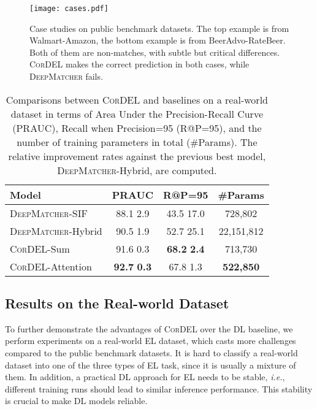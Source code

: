 \documentclass[conference]{IEEEtran}
\begin{document}
\begin{figure}
	\centering
	\texttt{[image: cases.pdf]}
	\caption{Case studies on public benchmark datasets. The top example is from Walmart-Amazon, the bottom example is from BeerAdvo-RateBeer. Both of them are non-matches, with subtle but critical differences. \textsc{CorDEL} makes the correct prediction in both cases, while \textsc{DeepMatcher} fails.}
	\label{fig:cases}
\end{figure}



\begin{table*}
	\centering
	\caption{Comparisons between \textsc{CorDEL} and baselines on a real-world dataset in terms of Area Under the Precision-Recall Curve (PRAUC), Recall when Precision=95 (R@P=95), and the number of training parameters in total (\#Params). The relative improvement rates against the previous best model, \textsc{DeepMatcher}-Hybrid, are computed.}
	\label{table:real_world}
	\begin{tabular}{lccc}
		\toprule
		Model & PRAUC & R@P=95 & \#Params \\
		\midrule
		\textsc{DeepMatcher}-SIF & 88.1  2.9 & 43.5  17.0 & 728,802 \\
		\textsc{DeepMatcher}-Hybrid & 90.5  1.9 & 52.7  25.1 & 22,151,812 \\
		\midrule
		\textsc{CorDEL}-Sum & 91.6  0.3 & \textbf{68.2}  \textbf{2.4}  & 713,730 \\
		\textsc{CorDEL}-Attention & \textbf{92.7}  \textbf{0.3}  & 67.8  1.3 & \textbf{522,850} \\
		\bottomrule
	\end{tabular}
\end{table*}




\subsection{Results on the Real-world Dataset}\label{sec:real_world_dataset}

To further demonstrate the advantages of \textsc{CorDEL} over the DL baseline, we perform experiments on a real-world EL dataset, which casts more challenges compared to the public benchmark datasets. It is hard to classify a real-world dataset into one of the three types of EL task, since it is usually a mixture of them. In addition, a practical DL approach for EL needs to be stable, \textit{i.e.}, different training runs should lead to similar inference performance. This stability is crucial to make DL models reliable.
\end{document}
